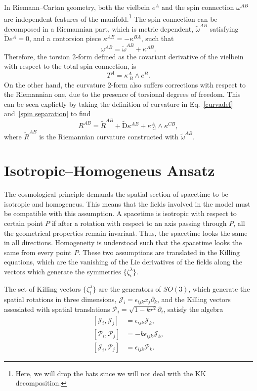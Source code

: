 \documentclass[aps,prd,12pt,superscriptaddress,showpacs,showkeys,reprint,nofootinbib]{revtex4-1}
\begin{document}
In Riemann--Cartan geometry, both the vielbein $e^A$ and the spin connection $\omega^{AB}$ are independent features of the manifold.\footnote{Here, we will drop the hats since we will not deal with the KK decomposition.} The spin connection can be decomposed in a Riemannian part, which is metric dependent, $\tilde{\omega}^{AB}$ satisfying $\tilde{\mbox{D}}e^A=0$, and a contorsion piece $\kappa^{AB}=-\kappa^{BA}$, such that 
\begin{equation}\label{spin separation}
  \omega^{AB}=\tilde{\omega}^{AB}+\kappa^{AB}.
\end{equation} 
Therefore, the torsion 2-form defined as the covariant derivative of the vielbein with respect to the total spin connection, is
\begin{equation}
  T^A=\kappa^A_{\ B}\wedge e^B.
\end{equation}
On the other hand, the curvature $2$-form also suffers corrections with respect to the Riemannian one, due to the presence of torsional degrees of freedom. This can be seen explictly by taking the definition of curvature in Eq.~\eqref{curvadef} and~\eqref{spin separation} to find
\begin{equation}\label{curvature decomp}
  R^{AB} = \tilde{R}^{AB} + \tilde{\mbox{D}}\kappa^{AB} + \kappa^A_{\ C}\wedge\kappa^{CB},
\end{equation}
where $\tilde{R}^{AB}$ is the Riemannian curvature constructed with $\tilde{\omega}^{AB}$.


\section{Isotropic--Homogeneus Ansatz\label{homotropic}}

The cosmological principle demands the spatial section of spacetime to be isotropic and homogeneus. This means that the fields involved in the model must be compatible with this assumption. A spacetime is isotropic with respect to certain point $P$ if after a rotation with respect to an axis passing through $P$, all the geometrical properties remain invariant. Thus, the spacetime looks the same in all directions. Homogeneity is understood such that the spacetime looks the same from every point $P$. These two assumptions are translated in the Killing equations, which are the vanishing of the Lie derivatives of the fields along the vectors which generate the symmetries $\{\zeta^\lambda_{i}\}$. 

The set of Killing vectors $\{\zeta^\lambda_i\}$ are the generators of $SO(3)$, which generate the spatial rotations in three dimensions, $\mathcal{J}_i=\epsilon_{ijk}x_j\partial_k$, and the Killing vectors assosiated with spatial translations $\mathcal{P}_i=\sqrt{1-kr^2}\partial_i$, satisfy the algebra
\begin{align*}
  \left[\mathcal{J}_i,\mathcal{J}_j\right]&=\epsilon_{ijk}\mathcal{J}_k,\\
  \left[\mathcal{P}_i,\mathcal{P}_j\right]&=-k\epsilon_{ijk}\mathcal{J}_k,\\
  \left[\mathcal{J}_i,\mathcal{P}_j\right]&=\epsilon_{ijk}\mathcal{P}_k.
\end{align*}
\end{document}
